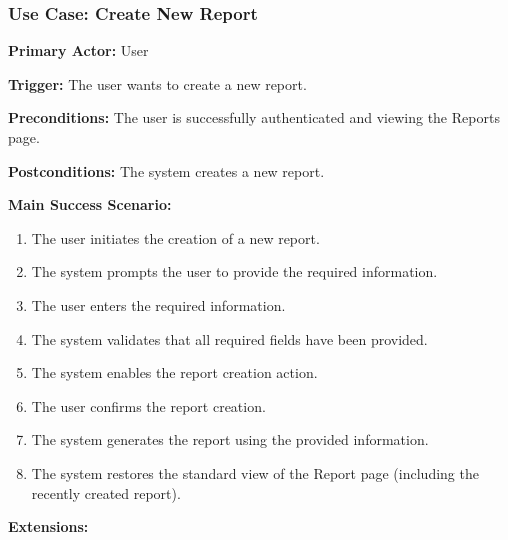 \subsubsection{\textbf{Use Case: Create New Report}}

\textbf{Primary Actor:} User

\textbf{Trigger:} The user wants to create a new report.

\textbf{Preconditions:} The user is successfully authenticated and viewing the Reports page.

\textbf{Postconditions:} The system creates a new report.

\vspace{0.5cm}

\textbf{Main Success Scenario:}

\begin{enumerate} [leftmargin=0.75cm, noitemsep]
\item The user initiates the creation of a new report.
\item The system prompts the user to provide the required information.
\item The user enters the required information.
\item The system validates that all required fields have been provided.
\item The system enables the report creation action.
\item The user confirms the report creation.
\item The system generates the report using the provided information.
\item The system restores the standard view of the Report page (including the recently created report).
\end{enumerate}

\vspace{1.3cm}

\textbf{Extensions:}

